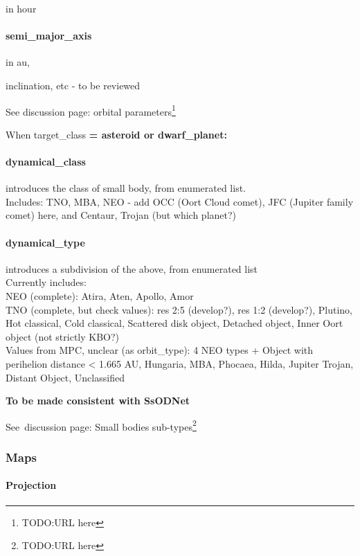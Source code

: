 \documentclass[11pt,a4paper]{ivoa}
\begin{document}
in hour

\paragraph{semi\_major\_axis}

in au,

inclination, etc - to be reviewed

See discussion page: orbital parameters\footnote{TODO:URL here}

When target\_class\textbf{ = asteroid or dwarf\_planet:\\}

\paragraph{dynamical\_class}

introduces the class of small body, from enumerated list.\\Includes: TNO, MBA, NEO - add OCC (Oort Cloud comet), JFC (Jupiter family comet) here, and Centaur, Trojan (but which planet?)

\paragraph{\textbf{dynamical\_type}}

introduces a subdivision of the above, from enumerated list\\Currently includes: \\NEO (complete): Atira, Aten, Apollo, Amor\\TNO (complete, but check values): res 2:5 (develop?), res 1:2 (develop?), Plutino, Hot classical, Cold classical, Scattered disk object, Detached object, Inner Oort object (not strictly KBO?)\\Values from MPC, unclear (as orbit\_type): 4 NEO types + Object with perihelion distance < 1.665 AU, Hungaria, MBA, Phocaea, Hilda, Jupiter Trojan, Distant Object, Unclassified

\textbf{To be made consistent with SsODNet\emph{\\}}

See discussion page: Small bodies sub-types\footnote{TODO:URL here}

\subsubsection{Maps\\}

\paragraph{Projection }
\end{document}
